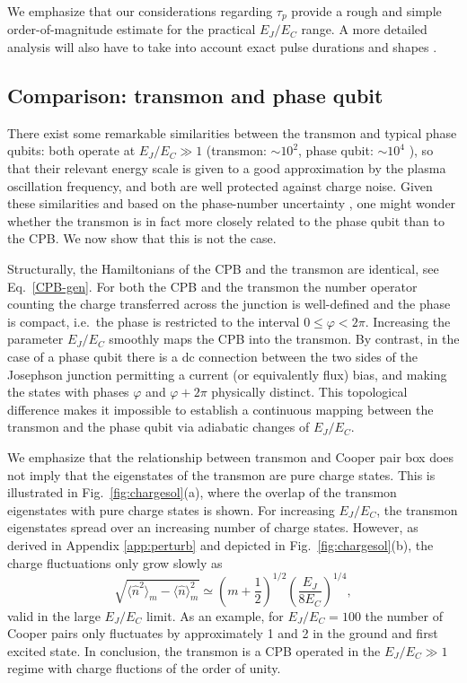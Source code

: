 \documentclass[twocolumn,amsmath,amssymb,floatfix,pra,showpacs,eqsecnum,footinbib,superscriptaddress]{revtex4}
\newcounter{fig}
\newcommand{\be}{\begin{equation}}
\newcommand{\ee}{\end{equation}}
\begin{document}
 We emphasize that our considerations regarding $\tau_p$ provide a rough and simple order-of-magnitude estimate for the practical $E_J/E_C$ range. A more detailed analysis will also have to take into account exact pulse durations and shapes \cite{fazio,steffen2}. 

\subsection{Comparison: transmon and phase qubit\label{sec:numberphase}}
There exist some remarkable similarities between the transmon and typical phase qubits: both operate at $E_J/E_C\gg1$ (transmon: $\sim10^2$, phase qubit: $\sim10^4$ \cite{martinis,steffen}), so that their relevant energy scale is given to a good approximation by the plasma oscillation frequency, and both are well protected against charge noise. Given these similarities and based on the phase-number uncertainty \cite{louisell}, one might wonder whether the transmon is in fact more closely related to the phase qubit than to the CPB. We now show that this is not the case.

Structurally, the Hamiltonians of the CPB and the transmon are identical, see Eq.~\eqref{CPB-gen}. 
For both the CPB and the transmon the number operator counting the charge transferred across the junction is well-defined and the phase is compact, i.e.~the phase is restricted to the interval $0\le\varphi<2\pi$. Increasing the parameter $E_J/E_C$ smoothly maps the CPB into the transmon. By contrast, in the case of a phase qubit there is a dc connection between the two sides of the Josephson junction permitting a current (or equivalently flux) bias, and making the states with phases $\varphi$ and $\varphi+2\pi$ physically distinct. This topological difference makes it impossible to establish a continuous mapping between the transmon and the phase qubit via adiabatic changes of $E_J/E_C$. 

We emphasize that the relationship between transmon and Cooper pair box does not imply that the eigenstates of the transmon are pure charge states. This is illustrated in Fig.~\ref{fig:chargesol}(a), where the overlap of the transmon eigenstates with pure charge states is shown. For increasing $E_J/E_C$, the transmon eigenstates spread over an increasing number of charge states. However, as derived in Appendix \ref{app:perturb} and depicted in Fig.~\ref{fig:chargesol}(b), the charge fluctuations only grow slowly as 
\be\label{chgfluc}
\sqrt{\langle \hat{n}^2 \rangle_m - \langle \hat{n} \rangle_m^2} \simeq \left(m+\frac{1}{2}\right)^{1/2}\left(\frac{E_J}{8E_C}\right)^{1/4},  
\ee
valid in the large $E_J/E_C$ limit.
As an example, for $E_J/E_C=100$ the number of Cooper pairs only fluctuates by approximately 1 and 2 in the ground and first excited state. In conclusion, the transmon is a CPB operated in the $E_J/E_C\gg1$ regime with charge fluctions of the order of unity.
\end{document}
